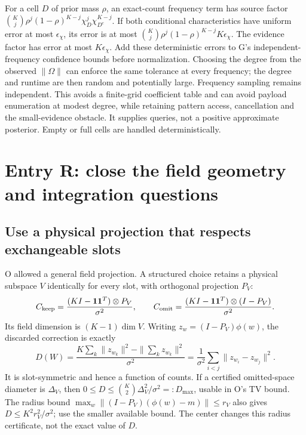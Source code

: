 \documentclass[10pt,a4paper]{article}
\begin{document}
For a cell $D$ of prior mass $\rho$, an exact-count frequency term has source factor
$\binom Kj\rho^j(1-\rho)^{K-j}\chi_D^j\chi_{D^c}^{K-j}$.
If both conditional characteristics have uniform error at most $\epsilon_\chi$, its error is at most
$\binom Kj\rho^j(1-\rho)^{K-j}K\epsilon_\chi$. The evidence factor has error at most $K\epsilon_\chi$.
Add these deterministic errors to G's independent-frequency confidence bounds before normalization.
Choosing the degree from the observed $\|\Omega\|$ can enforce the same tolerance at every frequency;
the degree and runtime are then random and potentially large. Frequency sampling remains independent.
This avoids a finite-grid coefficient table and can avoid payload enumeration at modest degree, while
retaining pattern access, cancellation and the small-evidence obstacle. It supplies queries, not a
positive approximate posterior. Empty or full cells are handled deterministically.

\clearpage
\section{Entry R: close the field geometry and integration questions}
\label{sec:field-closure}
\subsection{Use a physical projection that respects exchangeable slots}
O allowed a general field projection. A structured choice retains a physical subspace $V$ identically
for every slot, with orthogonal projection $P_V$:
\[
 C_{\rm keep}=\frac{(KI-\mathbf{1}\mathbf{1}^T)\otimes P_V}{\sigma^2},\qquad
 C_{\rm omit}=\frac{(KI-\mathbf{1}\mathbf{1}^T)\otimes(I-P_V)}{\sigma^2}.
\]
Its field dimension is $(K-1)\dim V$. Writing $z_w=(I-P_V)\phi(w)$, the discarded correction is exactly
\begin{equation}
 D(W)=\frac{K\sum_k\|z_{w_k}\|^2-\|\sum_kz_{w_k}\|^2}{\sigma^2}
     =\frac1{\sigma^2}\sum_{i<j}\|z_{w_i}-z_{w_j}\|^2.
 \label{eq:field-dispersion}
\end{equation}
It is slot-symmetric and hence a function of counts. If a certified omitted-space diameter is $\Delta_V$,
then $0\leq D\leq\binom K2\Delta_V^2/\sigma^2=:D_{\max}$, usable in O's TV bound.
The radius bound $\max_w\|(I-P_V)(\phi(w)-m)\|\leq r_V$ also gives
$D\leq K^2r_V^2/\sigma^2$; use the smaller available bound.
The center changes this radius certificate, not the exact value of $D$.
\end{document}
